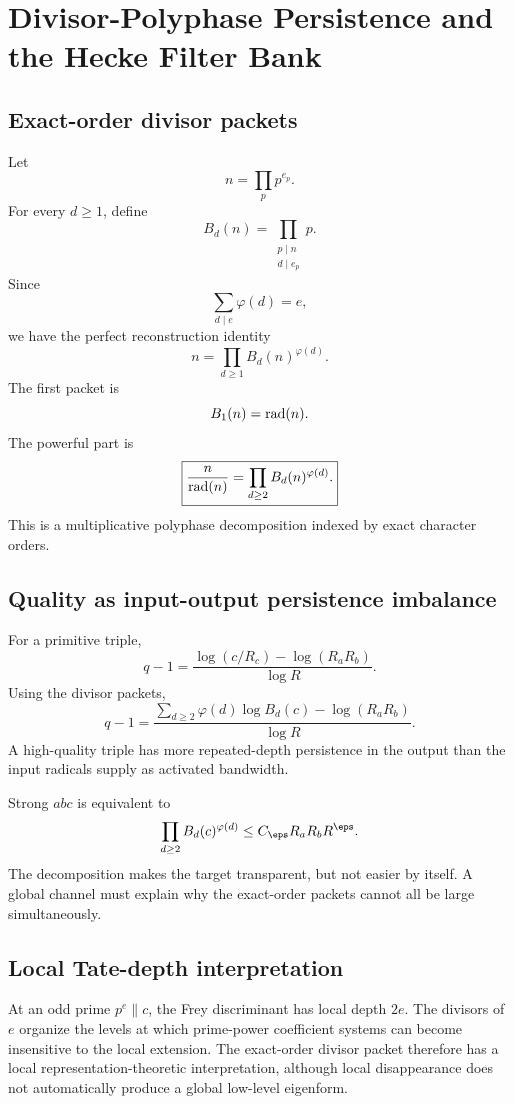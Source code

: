 \clearpage
\section{Divisor-Polyphase Persistence and the Hecke Filter Bank}

\subsection{Exact-order divisor packets}
Let
\[
 n=\prod_p p^{e_p}.
\]
For every $d\ge1$, define
\[
 \boxed{
 B_d(n)
 =
 \prod_{\substack{p\mid n\\d\mid e_p}}p.
 }
\]
Since
\[
 \sum_{d\mid e}\varphi(d)=e,
\]
we have the perfect reconstruction identity
\[
 \boxed{
 n
 =
 \prod_{d\ge1}
 B_d(n)^{\varphi(d)}.
 }
\]
The first packet is
\[
 B_1(n)=\operatorname{rad}(n).
\]
The powerful part is
\[
 \boxed{
 \frac{n}{\operatorname{rad}(n)}
 =
 \prod_{d\ge2}
 B_d(n)^{\varphi(d)}.
 }
\]
This is a multiplicative polyphase decomposition indexed by exact character orders.

\subsection{Quality as input-output persistence imbalance}
For a primitive triple,
\[
 q-1
 =
 \frac{
 \log(c/R_c)-\log(R_aR_b)
 }{
 \log R
 }.
\]
Using the divisor packets,
\[
 \boxed{
 q-1
 =
 \frac{
 \sum_{d\ge2}\varphi(d)\log B_d(c)
 -
 \log(R_aR_b)
 }{\log R}.
 }
\]
A high-quality triple has more repeated-depth persistence in the output than the input radicals supply as activated bandwidth.

Strong $abc$ is equivalent to
\[
 \prod_{d\ge2}
 B_d(c)^{\varphi(d)}
 \le
 C_\eps R_aR_bR^\eps.
\]
The decomposition makes the target transparent, but not easier by itself. A global channel must explain why the exact-order packets cannot all be large simultaneously.

\subsection{Local Tate-depth interpretation}
At an odd prime $p^e\parallel c$, the Frey discriminant has local depth $2e$. The divisors of $e$ organize the levels at which prime-power coefficient systems can become insensitive to the local extension. The exact-order divisor packet therefore has a local representation-theoretic interpretation, although local disappearance does not automatically produce a global low-level eigenform.

